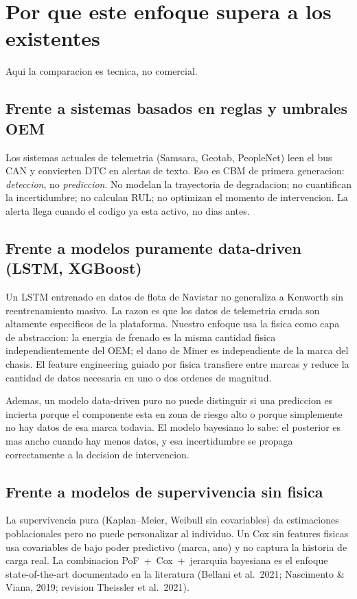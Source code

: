 \documentclass[10.5pt,a4paper]{article}
\begin{document}
\section{Por que este enfoque supera a los existentes}

Aqui la comparacion es tecnica, no comercial.

\subsection{Frente a sistemas basados en reglas y umbrales OEM}

Los sistemas actuales de telemetria (Samsara, Geotab, PeopleNet) leen el bus
CAN y convierten DTC en alertas de texto. Eso es CBM de primera generacion:
\textit{deteccion}, no \textit{prediccion}. No modelan la trayectoria de
degradacion; no cuantifican la incertidumbre; no calculan RUL; no optimizan
el momento de intervencion. La alerta llega cuando el codigo ya esta activo,
no dias antes.

\subsection{Frente a modelos puramente data-driven (LSTM, XGBoost)}

Un LSTM entrenado en datos de flota de Navistar no generaliza a Kenworth sin
reentrenamiento masivo. La razon es que los datos de telemetria cruda son
altamente especificos de la plataforma. Nuestro enfoque usa la fisica como
capa de abstraccion: la energia de frenado es la misma cantidad fisica
independientemente del OEM; el dano de Miner es independiente de la marca
del chasis. El feature engineering guiado por fisica transfiere entre marcas
y reduce la cantidad de datos necesaria en uno o dos ordenes de magnitud.

Ademas, un modelo data-driven puro no puede distinguir si una prediccion es
incierta porque el componente esta en zona de riesgo alto o porque simplemente
no hay datos de esa marca todavia. El modelo bayesiano lo sabe: el posterior
es mas ancho cuando hay menos datos, y esa incertidumbre se propaga
correctamente a la decision de intervencion.

\subsection{Frente a modelos de supervivencia sin fisica}

La supervivencia pura (Kaplan--Meier, Weibull sin covariables) da estimaciones
poblacionales pero no puede personalizar al individuo. Un Cox sin features
fisicas usa covariables de bajo poder predictivo (marca, ano) y no captura
la historia de carga real. La combinacion PoF~+~Cox~+~jerarquia bayesiana
es el enfoque state-of-the-art documentado en la literatura (Bellani et al.~2021;
Nascimento \& Viana, 2019; revision Theissler et al.~2021).
\end{document}
